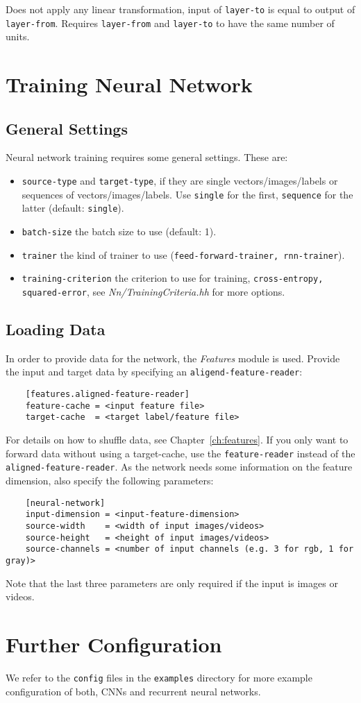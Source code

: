 Does not apply any linear transformation, \ie input of \texttt{layer-to} is equal to output of \texttt{layer-from}. Requires \texttt{layer-from} and \texttt{layer-to} to have the same number of units.


\section{Training Neural Network}

\subsection{General Settings}

Neural network training requires some general settings. These are:
\begin{itemize}
    \item \texttt{source-type} and \texttt{target-type}, \ie if they are single vectors/images/labels or sequences of vectors/images/labels. Use \texttt{single} for the first, \texttt{sequence} for the latter (default: \texttt{single}).
    \item \texttt{batch-size} the batch size to use (default: 1).
    \item \texttt{trainer} the kind of trainer to use (\texttt{feed-forward-trainer, rnn-trainer}).
    \item \texttt{training-criterion} the criterion to use for training, \eg \texttt{cross-entropy, squared-error}, see \textit{Nn/TrainingCriteria.hh} for more options.
\end{itemize}

\subsection{Loading Data}

In order to provide data for the network, the \textit{Features} module is used. Provide the input and target data by specifying an \texttt{aligend-feature-reader}:
\begin{verbatim}
    [features.aligned-feature-reader]
    feature-cache = <input feature file>
    target-cache  = <target label/feature file>
\end{verbatim}
For details \eg on how to shuffle data, see Chapter~\ref{ch:features}. If you only want to forward data without using a target-cache, use the \texttt{feature-reader} instead of the \texttt{aligned-feature-reader}. As the network needs some information on the feature dimension, also specify the following parameters:
\begin{verbatim}
    [neural-network]
    input-dimension = <input-feature-dimension>
    source-width    = <width of input images/videos>
    source-height   = <height of input images/videos>
    source-channels = <number of input channels (e.g. 3 for rgb, 1 for gray)>
\end{verbatim}

Note that the last three parameters are only required if the input is images or videos.

\section{Further Configuration}

We refer to the \texttt{config} files in the \texttt{examples} directory for more example configuration of both, CNNs and recurrent neural networks.
